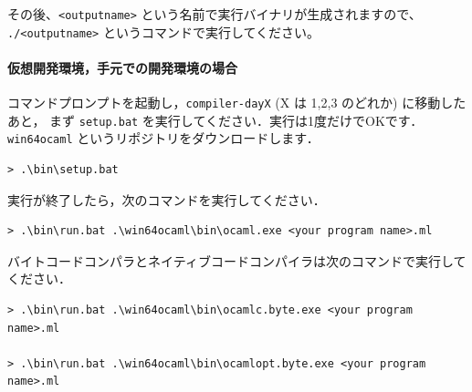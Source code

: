 \documentclass[a4paper,11pt]{jsarticle}
\begin{document}
その後、\verb|<outputname>| という名前で実行バイナリが生成されますので、
\verb|./<outputname>| というコマンドで実行してください。

\paragraph*{仮想開発環境，手元での開発環境の場合}

コマンドプロンプトを起動し，\verb|compiler-dayX| (X は 1,2,3 のどれか) に移動したあと，
まず \verb|setup.bat| を実行してください．実行は1度だけでOKです．\verb|win64ocaml| というリポジトリをダウンロードします．

\begin{lstlisting}
> .\bin\setup.bat
\end{lstlisting}

実行が終了したら，次のコマンドを実行してください．

\begin{lstlisting}
> .\bin\run.bat .\win64ocaml\bin\ocaml.exe <your program name>.ml
\end{lstlisting}

バイトコードコンパラとネイティブコードコンパイラは次のコマンドで実行してください．

\begin{lstlisting}
> .\bin\run.bat .\win64ocaml\bin\ocamlc.byte.exe <your program name>.ml

> .\bin\run.bat .\win64ocaml\bin\ocamlopt.byte.exe <your program name>.ml
\end{lstlisting}






\end{document}
